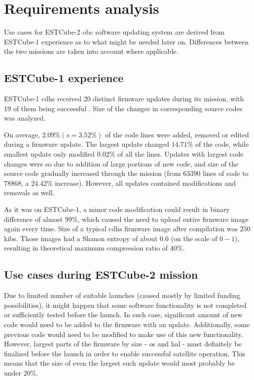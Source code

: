 \newpage
\section{Requirements analysis}

Use cases for ESTCube-2 \gls{obc} software updating system are derived from ESTCube-1 experience as to what might be needed later on. Differences between the two missions are taken into account where applicable.

\subsection{ESTCube-1 experience}

ESTCube-1 \gls{cdhs} received 20 distinct firmware updates during its mission, with 19 of them being successful \cite{Suenter2016}. Size of the changes in corresponding source codes was analyzed.

On average, $2.09\% (s=3.52\%)$ of the code lines were added, removed or edited during a firmware update. The largest update changed $14.71\%$ of the code, while smallest update only modified $0.02\%$ of all the lines. Updates with largest code changes were so due to addition of large portions of new code, and size of the source code gradually increased through the mission (from $63390$ lines of code to $78868$, a $24.42\%$ increase). However, all updates contained modifications and removals as well.

As it was on ESTCube-1, a minor code modification could result in binary difference of almost $99\%$, which caused the need to upload entire firmware image again every time. Size of a typical \gls{cdhs} firmware image after compilation was $250$ \glspl{kib}. Those images had a Shanon entropy of about $0.6$ (on the scale of $0-1$), resulting in theoretical maximum compression ratio of $40\%$. \cite{Suenter2016}

\subsection{Use cases during ESTCube-2 mission}

Due to limited number of suitable launches (caused mostly by limited funding possibilities), it might happen that some software functionality is not completed or sufficiently tested before the launch. In such case, significant amount of new code would need to be added to the firmware with an update. Additionally, some previous code would need to be modified to make use of this new functionality. However, largest parts of the firmware by size - \gls{os} and \gls{hal} - must definitely be finalized before the launch in order to enable successful satellite operation. This means that the size of even the largest such update would most probably be under $20\%$.

